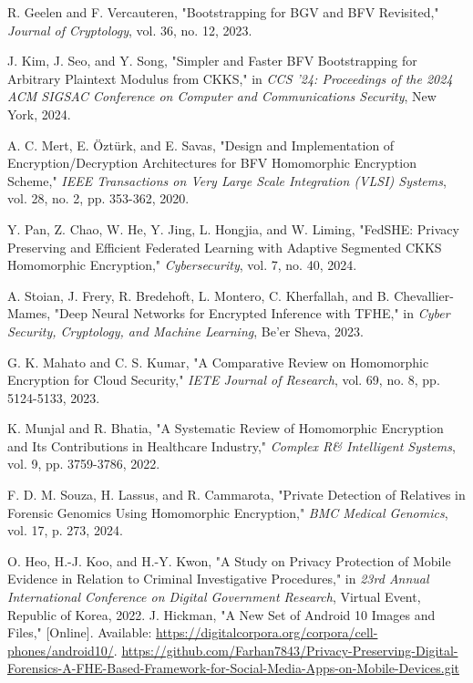 \documentclass[conference]{IEEEtran}
\begin{document}
\begin{thebibliography}{00}
 R. Geelen and F. Vercauteren, "Bootstrapping for BGV and BFV Revisited," \textit{Journal of Cryptology}, vol. 36, no. 12, 2023.

 J. Kim, J. Seo, and Y. Song, "Simpler and Faster BFV Bootstrapping for Arbitrary Plaintext Modulus from CKKS," in \textit{CCS '24: Proceedings of the 2024 ACM SIGSAC Conference on Computer and Communications Security}, New York, 2024.

 A. C. Mert, E. Öztürk, and E. Savas, "Design and Implementation of Encryption/Decryption Architectures for BFV Homomorphic Encryption Scheme," \textit{IEEE Transactions on Very Large Scale Integration (VLSI) Systems}, vol. 28, no. 2, pp. 353-362, 2020.

 Y. Pan, Z. Chao, W. He, Y. Jing, L. Hongjia, and W. Liming, "FedSHE: Privacy Preserving and Efficient Federated Learning with Adaptive Segmented CKKS Homomorphic Encryption," \textit{Cybersecurity}, vol. 7, no. 40, 2024.

 A. Stoian, J. Frery, R. Bredehoft, L. Montero, C. Kherfallah, and B. Chevallier-Mames, "Deep Neural Networks for Encrypted Inference with TFHE," in \textit{Cyber Security, Cryptology, and Machine Learning}, Be'er Sheva, 2023.

 G. K. Mahato and C. S. Kumar, "A Comparative Review on Homomorphic Encryption for Cloud Security," \textit{IETE Journal of Research}, vol. 69, no. 8, pp. 5124-5133, 2023.

 K. Munjal and R. Bhatia, "A Systematic Review of Homomorphic Encryption and Its Contributions in Healthcare Industry," \textit{Complex R\& Intelligent Systems}, vol. 9, pp. 3759-3786, 2022.

 F. D. M. Souza, H. Lassus, and R. Cammarota, "Private Detection of Relatives in Forensic Genomics Using Homomorphic Encryption," \textit{BMC Medical Genomics}, vol. 17, p. 273, 2024.

 O. Heo, H.-J. Koo, and H.-Y. Kwon, "A Study on Privacy Protection of Mobile Evidence in Relation to Criminal Investigative Procedures," in \textit{23rd Annual International Conference on Digital Government Research}, Virtual Event, Republic of Korea, 2022.
 J. Hickman, "A New Set of Android 10 Images and Files," [Online]. Available: \url{https://digitalcorpora.org/corpora/cell-phones/android10/}.
\url{https://github.com/Farhan7843/Privacy-Preserving-Digital-Forensics-A-FHE-Based-Framework-for-Social-Media-Apps-on-Mobile-Devices.git}

\end{thebibliography}
\end{document}
